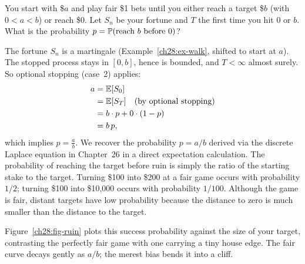 \begin{example}
\label{ch28:ex-ruin}
You start with \$$a$ and play fair \$1 bets until you either reach a target \$$b$ (with $0 < a < b$)
or reach \$0. Let $S_n$ be your fortune and $T$ the first time you hit $0$ or $b$. What is the
probability $p = \P(\text{reach } b \text{ before } 0)$?

The fortune $S_n$ is a martingale (Example~\ref{ch28:ex-walk}, shifted to start at $a$). The stopped
process stays in $[0,b]$, hence is bounded, and $T < \infty$ almost surely. So optional stopping (case~2) applies:
\begin{align*}
  a &= \E[S_0] \\
  &= \E[S_T] \quad\text{(by optional stopping)} \\
  &= b \cdot p + 0\cdot(1-p) \\
  &= b\,p,
\end{align*}
which implies $p = \frac{a}{b}$.
We recover the probability $p = a/b$ derived via the
discrete Laplace equation in Chapter~26 in a direct expectation calculation. The
probability of reaching the target before ruin is simply the ratio of the starting stake to the
target. Turning \$100 into \$200 at a fair game occurs with probability $1/2$; turning \$100 into
\$10{,}000 occurs with probability $1/100$. Although the game is fair,
distant targets have low probability because the distance to zero is much smaller than the distance to the target.
\end{example}

Figure~\ref{ch28:fig-ruin} plots this success probability against the size of your target, contrasting
the perfectly fair game with one carrying a tiny house edge. The fair curve decays gently as
$a/b$; the merest bias bends it into a cliff.


